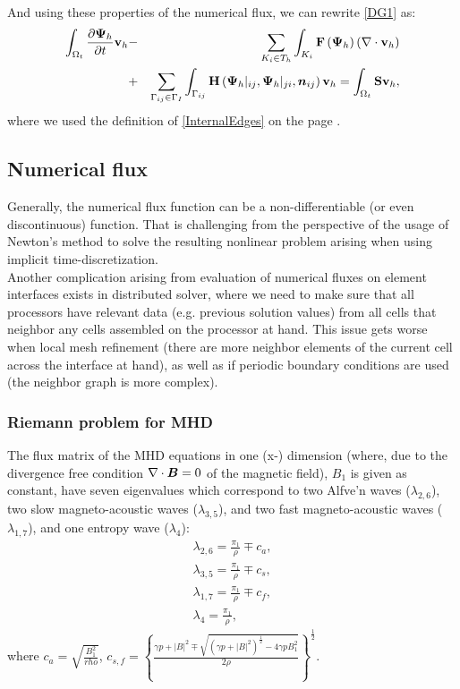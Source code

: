 And using these properties of the numerical flux, we can rewrite \ref{DG1} as:
\begin{eqnarray}
\label{DG2} \int_{\Omega_{t}} \frac{\partial{{\mathrm{\mathbf{\Psi}}_h}}}{\partial{t}} \mathrm{\mathbf{v}}_h & - & \sum_{K_i \in T_h}\int_{K_i}\mathrm{\mathbf{F}}\left({\mathrm{\mathbf{\Psi}}_h}\right) \left(\nabla \cdot \mathrm{\mathbf{v}}_h\right)\\ \nonumber & + & \sum_{\Gamma_{ij}\in\Gamma_I} \int_{\Gamma_{ij}} \mathrm{\mathbf{H}}\left({\mathrm{\mathbf{\Psi}}_h}|_{ij}, {\mathrm{\mathbf{\Psi}}_h}|_{ji}, \mbox{\boldmath $n$}_{ij}\right) \mathrm{\mathbf{v}}_h = \int_{\Omega_{t}} \mathrm{\mathbf{S}} \mathrm{\mathbf{v}}_h,
\end{eqnarray}
where we used the definition of \ref{InternalEdges} on the page \pageref{InternalEdges}.
\subsection{Numerical flux}
Generally, the numerical flux function can be a non-differentiable (or even discontinuous) function. That is challenging from the perspective of the usage of Newton's method to solve the resulting nonlinear problem arising when using implicit time-discretization.\ \\
Another complication arising from evaluation of numerical fluxes on element interfaces exists in distributed solver, where we need to make sure that all processors have relevant data (e.g. previous solution values) from all cells that neighbor any cells assembled on the processor at hand. This issue gets worse when local mesh refinement (there are more neighbor elements of the current cell across the interface at hand), as well as if periodic boundary conditions are used (the neighbor graph is more complex).
\subsubsection{Riemann problem for MHD}
The flux matrix of the MHD equations in one (x-) dimension (where, due to the divergence free condition $\nabla\cdot \mbox{\boldmath $B$} = 0$ of the magnetic field), $B_1$ is given as constant, have seven eigenvalues which correspond to two Alfve'n waves ($\lambda_{2, 6}$), two slow magneto-acoustic waves ($\lambda_{3, 5}$), and two fast magneto-acoustic waves ($\lambda_{1, 7}$), and one entropy wave ($\lambda_{4}$):
\begin{eqnarray}
\lambda_{2, 6} = \frac{\pi_1}{\rho} \mp c_a,\\
\lambda_{3, 5} = \frac{\pi_1}{\rho} \mp c_s,\\
\lambda_{1, 7} = \frac{\pi_1}{\rho} \mp c_f,\\
\lambda_{4} = \frac{\pi_1}{\rho},
\end{eqnarray}
where $c_a = \sqrt{\frac{B_1^2}{rho}}$, $c_{s, f} = \left\{\frac{\gamma p + |B|^2 \mp \sqrt{\left(\gamma p + |B|^2\right)^{\frac12} - 4\gamma p B_1^2}}{2\rho}\right\}^{\frac12}$.
